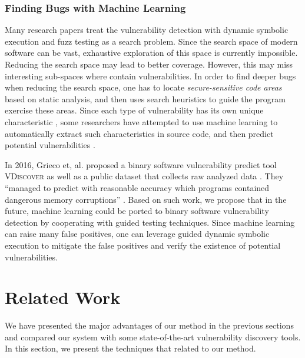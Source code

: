 \documentclass{cta-author}
\begin{document}
\subsubsection{Finding Bugs with Machine Learning}
Many research papers treat the vulnerability detection with dynamic 
symbolic execution and fuzz testing as a search problem.
Since the search space of modern software can be vast, exhaustive 
exploration of this space is currently impossible.
Reducing the search space may lead to better coverage.
However, this may miss interesting sub-spaces where contain vulnerabilities. 
In order to find deeper bugs when reducing the search space, 
one has to locate \textit{secure-sensitive code areas} based on 
static analysis, and then uses search heuristics to guide 
the program exercise these areas.
Since each type of vulnerability has its own unique 
characteristic \cite{MBishop:ATBOC, wang2009intscope, wang2010ricb}, 
some researchers have attempted to use machine learning to 
automatically extract such characteristics in source code, and 
then predict potential vulnerabilities \cite{VCCFinder, Yamaguchi:2011:VEA}.

In 2016, Grieco et, al. proposed a binary software vulnerability 
predict tool \textsc{VDiscover} as well as a public dataset that 
collects raw analyzed data \cite{Grieco:2016:TLV}. 
They ``managed to predict with reasonable accuracy which programs 
contained dangerous memory corruptions'' \cite{Grieco:2016:TLV}.
Based on such work, we propose that in the future, machine learning 
could be ported to binary software vulnerability detection by 
cooperating with guided testing techniques. Since machine learning 
can raise many false positives, one can leverage guided dynamic 
symbolic execution to mitigate the false positives and verify the 
existence of potential vulnerabilities.

\section{Related Work} \label{sec:related}
We have presented the major advantages of our method in the previous sections and compared our system with some state-of-the-art vulnerability discovery tools. In this section, we present the techniques that related to our method.
\end{document}
